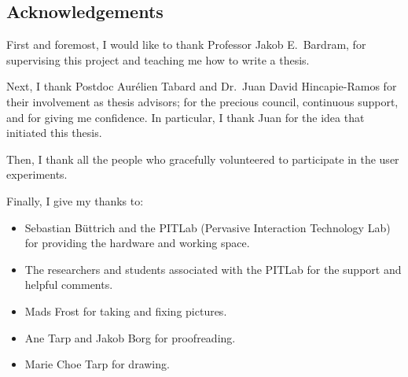 \documentclass[a4paper,11pt,twoside,onecolumn,openright]{memoir}
\begin{document}


\subsection*{Acknowledgements}

First and foremost, I would like to thank Professor Jakob E.\ Bardram, for supervising this project and teaching me how to write a thesis.

Next, I thank Postdoc Aur\'{e}lien Tabard and Dr.\ Juan David Hincapie-Ramos for their involvement as thesis advisors; for the precious council, continuous support, and for giving me confidence.
In particular, I thank Juan for the idea that initiated this thesis.

Then, I thank all the people who gracefully volunteered to participate in the user experiments.

Finally, I give my thanks to:
\tightlists
\begin{itemize}[-]

\item Sebastian B\"{u}ttrich and the PITLab (Pervasive Interaction Technology Lab) for providing the hardware and working space.

\item The researchers and students associated with the PITLab for the support and helpful comments.

\item Mads Frost for taking and fixing pictures.

\item Ane Tarp and Jakob Borg for proofreading.

\item Marie Choe Tarp for drawing.

\end{itemize}

\clearpage

\newpage
\mbox{}
\clearpage

\pagestyle{headings}
\tableofcontents

\clearpage

\firmlists



%















\end{document}
